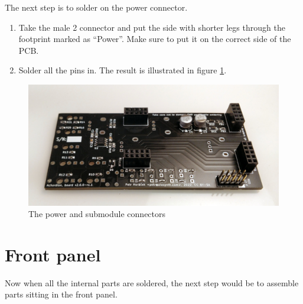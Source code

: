 \documentclass[10pt,a4paper,twocolumn]{article}
\begin{document}
The next step is to solder on the power connector.

\begin{enumerate}
  \item Take the male 2 connector and put the side with shorter legs through the footprint marked as ``Power''. Make sure to put it on the correct side of the PCB.
  \item Solder all the pins in. The result is illustrated in figure \ref{connectors}.
\end{enumerate}

\begin{figure}[p]
  \centering
  \includegraphics[width=\linewidth]{p03.jpg}
  \caption{The power and submodule connectors}
  \label{connectors}
\end{figure}

\section{Front panel}

Now when all the internal parts are soldered, the next step would be to assemble parts sitting in the front panel.
\end{document}
